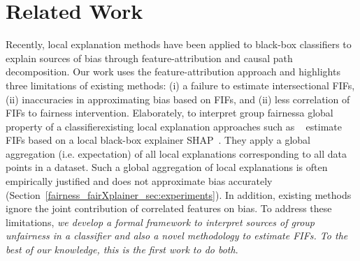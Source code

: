 \begin{example}
\end{example}



\section{Related Work}
\label{fairness_fairXplainer_sec:related_work}
Recently, local explanation methods have been applied to black-box classifiers to explain sources of bias through feature-attribution\cite{begley2020explainability,lundberg2020explaining} and causal path decomposition\cite{pan2021explaining}. Our work uses the feature-attribution approach and highlights three limitations of existing methods: (i) a failure to estimate intersectional FIFs, (ii) inaccuracies in approximating bias based on FIFs, and (ii) less correlation of FIFs to fairness intervention. Elaborately, to interpret group fairness\textemdash a global property of a classifier\textemdash existing local explanation approaches such as ~\cite{begley2020explainability,lundberg2020explaining} estimate FIFs based on a local black-box explainer SHAP~\cite{lundberg2017unified}. They apply a global aggregation (i.e. expectation) of all local explanations corresponding to all data points in a dataset. Such a global aggregation of local explanations is often empirically justified and does not approximate bias accurately (Section~\ref{fairness_fairXplainer_sec:experiments}).  In addition, existing methods ignore the joint contribution of correlated features on bias. To address these limitations, \textit{we develop a formal framework to interpret sources of group unfairness in a classifier and also a novel methodology to estimate FIFs. To the best of our knowledge, this is the first work to do both}.


